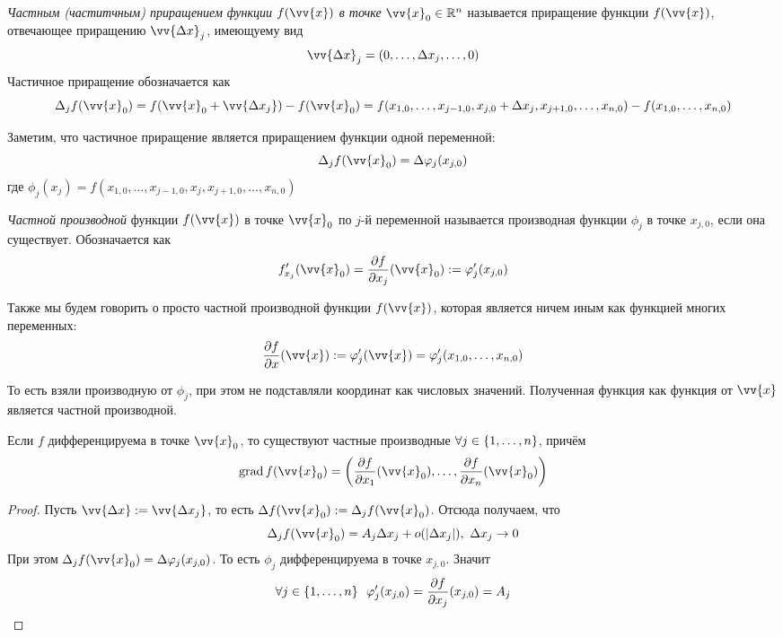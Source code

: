 \begin{definition}
	\textit{Частным (частитчным) приращением функции $f(\vv{x})$ в точке} $\vv{x}_0 \in \R^n$ называется приращение функции $f(\vv{x})$, отвечающее 	приращению $\vv{\Delta x}_j$, имеющуему вид
	\[
		\vv{\Delta x}_j = (0, \ldots, \Delta x_j, \ldots, 0)
	\]
	Частичное приращение обозначается как
	\[
		\Delta_j f(\vv{x}_0) = f(\vv{x}_0 + \vv{\Delta x_j}) - f(\vv{x}_0) = f(x_{1, 0}, \ldots, x_{j - 1, 0}, x_{j, 0} + \Delta x_j, x_{j + 1, 0}, \ldots, x_{n, 0}) - f(x_{1, 0}, \ldots, x_{n, 0})
	\]
\end{definition}

\begin{note}
	Заметим, что частичное приращение является приращением функции одной переменной:
	\[
		\Delta_j f(\vv{x}_0) = \Delta \phi_j (x_{j, 0})
	\]
	где $\phi_j(x_j) = f(x_{1, 0}, \ldots, x_{j - 1, 0}, x_j, x_{j + 1, 0}, \ldots, x_{n, 0})$
\end{note}

\begin{definition}
	\textit{Частной производной} функции $f(\vv{x})$ в точке $\vv{x}_0$ по $j$-й переменной называется производная функции $\phi_j$ в точке $x_{j, 0}$, если она существует. Обозначается как 
	\[
		f'_{x_j}(\vv{x}_0) = \pd{f}{x_j} (\vv{x}_0) := \phi'_j (x_{j, 0})
	\]
\end{definition}

\begin{definition}
	Также мы будем говорить о просто частной производной функции $f(\vv{x})$, которая является ничем иным как функцией многих переменных:
	\[
		\pd{f}{x} (\vv{x}) := \phi'_j(\vv{x}) = \phi'_j (x_{1, 0}, \ldots, x_{n, 0})
	\]
\end{definition}

\begin{note}
	То есть взяли производную от $\phi_j$, при этом не подставляли координат как числовых значений. Полученная функция как функция от $\vv{x}$ является частной производной.
\end{note}

\begin{theorem}
	Если $f$ дифференцируема в точке $\vv{x}_0$, то существуют частные производные $\forall j \in \{1, \ldots, n\}$, причём
	\[
		\grad f(\vv{x}_0) = \left(\frac{\vdelta f}{\vdelta x_1}(\vv{x}_0), \ldots, \frac{\vdelta f}{\vdelta x_n}(\vv{x}_0)\right)
	\]
\end{theorem}

\begin{proof}
	Пусть $\vv{\Delta x} := \vv{\Delta x_j}$, то есть $\Delta f(\vv{x}_0) := \Delta_j f(\vv{x}_0)$. Отсюда получаем, что
	\[
		\Delta_j f(\vv{x}_0) = A_j \Delta x_j + o(|\Delta x_j|),\ \Delta x_j \to 0
	\]
	При этом $\Delta_j f(\vv{x}_0) = \Delta \phi_j (x_{j, 0})$. То есть $\phi_j$ дифференцируема в точке $x_{j, 0}$. Значит
	\[
		\forall j \in \{1, \ldots, n\}\ \ \varphi'_j (x_{j, 0}) = \frac{\partial f}{\partial x_j} (x_{j, 0}) = A_j
	\]
\end{proof}

